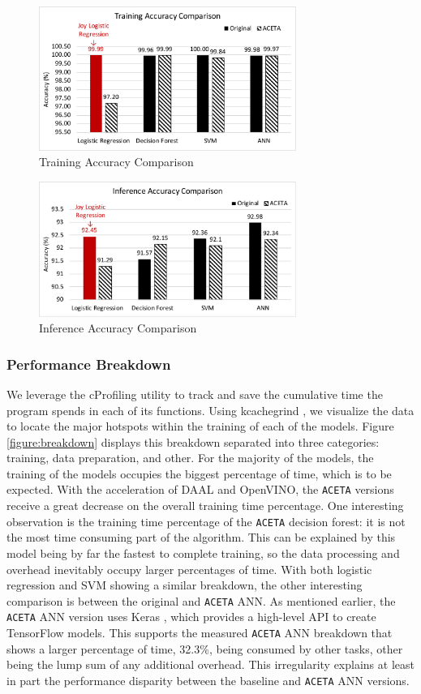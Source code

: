 \begin{figure}[h!]
	\centering
	\includegraphics[width=3.3in]{./fig/training-accuracy.pdf}
	\caption{Training Accuracy Comparison}
	\label{figure:training-accuracy}
\end{figure}

\begin{figure}[h!]
	\centering
	\includegraphics[width=3.3in]{./fig/inference-accuracy.pdf}
	\caption{Inference Accuracy Comparison}
	\label{figure:inference-accuracy}
\end{figure}

\subsubsection{Performance Breakdown}
We leverage the cProfiling utility to track and save the cumulative time the program spends in each of its functions. Using kcachegrind \cite{kcachegrind}, we visualize the data to locate the major hotspots within the training of each of the models. Figure \ref{figure:breakdown} displays this breakdown separated into three categories: training, data preparation, and other. For the majority of the models, the training of the models occupies the biggest percentage of time, which is to be expected. With the acceleration of DAAL and OpenVINO, the \texttt{ACETA} versions receive a great decrease on the overall training time percentage. One interesting observation is the training time percentage of the \texttt{ACETA} decision forest: it is not the most time consuming part of the algorithm. This can be explained by this model being by far the fastest to complete training, so the data processing and overhead inevitably occupy larger percentages of time. With both logistic regression and SVM showing a similar breakdown, the other interesting comparison is between the original and \texttt{ACETA} ANN. As mentioned earlier, the \texttt{ACETA} ANN version uses Keras \cite{keras}, which provides a high-level API to create TensorFlow models. This supports the measured \texttt{ACETA} ANN breakdown that shows a larger percentage of time, 32.3\%, being consumed by other tasks, other being the lump sum of any additional overhead. This irregularity explains at least in part the performance disparity between the baseline and \texttt{ACETA} ANN versions.


